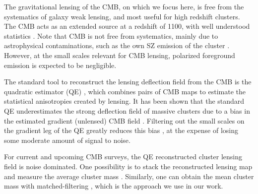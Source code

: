 \documentclass[prd, superscriptaddress, tightenlines, longbibliography, nofootinbib, eqsecnum, amsfonts, amsmath, floatfix, twocolumn, notitlepage]{revtex4-2}
\newcommand{\LL}[1]{{\color{orange}{LL: #1}}}
\begin{document}

The gravitational lensing of the CMB, on which we focus here, is free from the systematics of galaxy weak lensing, and most useful for high redshift clusters. 
The CMB acts as an extended source at a redshift of 1100, with well understood statistics \cite{Lewis:2006fu}.
Note that CMB is not free from systematics, mainly due to astrophysical contaminations, such as the own SZ emission of the cluster \cite{Madhavacheril:2018bxi, DES:2018myw, Patil_2020}.
However, at the small scales relevant for CMB lensing, polarized foreground emission is expected to be negligible.

The standard tool to reconstruct the lensing deflection field from the CMB is the quadratic estimator (QE) \cite{Hu:2001tn, Hu:2001kj, Okamoto:2003zw, Planck:2018lbu}, which combines pairs of CMB maps to estimate the statistical anisotropies created by lensing.
It has been shown that the standard QE underestimates the strong deflection field of massive clusters due to a bias in the estimated gradient (unlensed) CMB field \cite{Maturi:2004zj}. Filtering out the small scales on the gradient leg of the QE greatly reduces this bias \cite{Hu:2007bt}, at the expense of losing some moderate amount of signal to noise.

For current and upcoming CMB surveys, the QE reconstructed cluster lensing field is noise dominated. One possibility is to stack the reconstructed lensing map and measure the average cluster mass \cite{DES:2017fyz, Geach:2017crt, DES:2018myw, ACT:2020izl}. Similarly, one can obtain the mean cluster mass with matched-filtering \cite{Melin:2014uaa, Louis:2016gvv, Zubeldia:2019brr, Zubeldia:2020knz}, which is the approach we use in our work. \LL{Maybe this paragraph should be moved later (even maybe on the section II B ?)}
\end{document}
